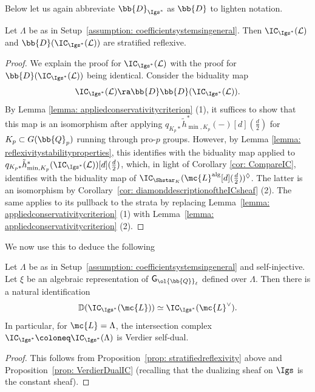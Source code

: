\documentclass[letterpaper,11pt]{amsart}
\begin{document}
Below let us again abbreviate $\bb{D}_{\Igs^{*}}$ as $\bb{D}$ to lighten notation.
\begin{proposition}{\label{prop: stratifiedreflexivity}}
Let $\Lambda$ be as in Setup~\ref{assumption: coefficientsystemsingeneral}. Then $\IC_{\Igs^{*}}(\mathcal{L})$ and $\bb{D}(\IC_{\Igs^{*}}(\mathcal{L}))$ are stratified reflexive.
\end{proposition}
\begin{proof}
We explain the proof for $\IC_{\Igs^{*}}(\mathcal{L})$ with the proof for $\bb{D}(\IC_{\Igs^{*}}(\mathcal{L}))$ being identical. Consider the biduality map 
\[ \IC_{\Igs^{*}}(\mathcal{L}) \ra \bb{D}\bb{D}(\IC_{\Igs^{*}}(\mathcal{L})). \]
By Lemma \ref{lemma: appliedconservativitycriterion} (1), it suffices to show that this map is an isomorphism after applying $q_{K_{p}*}\tilde{h}_{\min,K_{p}}^{*}(-)[d](\frac{d}{2})$ for $K_{p} \subset G(\bb{Q}_{p})$ running through pro-$p$ groups. However, by Lemma \ref{lemma: reflexivitystabilityproperties}, this identifies with the biduality map applied to $q_{K_{p}*}\tilde{h}_{\min,K_{p}}^{*}(\IC_{\Igs^{*}}(\mathcal{L}))[d](\frac{d}{2})$, which, in light of Corollary \ref{cor: CompareIC}, identifies with the biduality map of $\IC_{\Shstar_K}(\mc{L}^\mathrm{alg}[d](\frac{d}{2}))^\Diamond$. The latter is an isomorphism by Corollary~\ref{cor: diamonddescriptionoftheICsheaf} (2). The same applies to its pullback to the strata by replacing Lemma~\ref{lemma: appliedconservativitycriterion} (1) with Lemma~\ref{lemma: appliedconservativitycriterion} (2).
\end{proof}
We now use this to deduce the following
\begin{corollary}\label{cor: VerdierSelfDualityofICIgs}
    Let $\Lambda$ be as in Setup~\ref{assumption: coefficientsystemsingeneral} and self-injective. Let $\xi$ be an algebraic representation of $\mathsf{G}_{\ol{\bb{Q}}_\ell}$ defined over $\Lambda$. Then there is a natural identification 
    \[\mathbb{D}(\IC_{\Igs^\ast}(\mc{L})) \simeq \IC_{\Igs^\ast}(\mc{L}^\vee).\]
    In particular, for $\mc{L}=\Lambda$, the intersection complex $\IC_{\Igs^\ast}\coloneq\IC_{\Igs^\ast}(\Lambda)$ is Verdier self-dual.
\end{corollary}
\begin{proof}
    This follows from Proposition~\ref{prop: stratifiedreflexivity} above and Proposition~\ref{prop: VerdierDualIC} (recalling that the dualizing sheaf on $\Igs$ is the constant sheaf). 
\end{proof}
\end{document}
